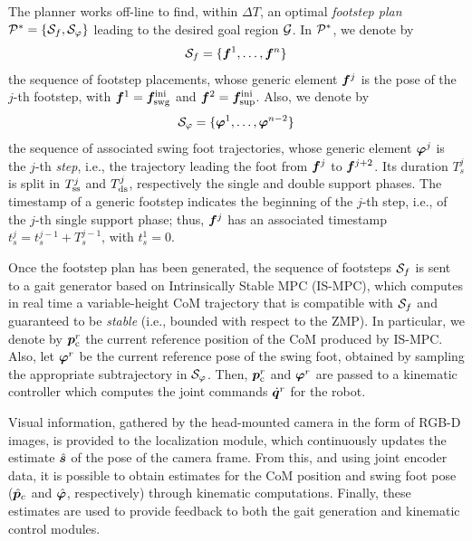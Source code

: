 The planner works off-line to find, within $\Delta T$, an optimal \textit{footstep plan} ${\cal P}^\ast = \{ {\cal S}_f, {\cal S}_\varphi \}$ leading to the desired goal region $\cal G$. In ${\cal P}^*$, we denote by
\begin{equation*}
    {\cal S}_f = \{{\bm{f}}^1, \dots, {\bm{f}}^n\}
\end{equation*}
the sequence of footstep placements, whose generic element ${\bm{f}}^j$ is the pose of the $j$-th footstep, with ${\bm{f}}^1 = {\bm{f}}_{\rm swg}^{\rm ini}$ and ${\bm{f}}^2 = {\bm{f}}_{\rm sup}^{\rm ini}$. Also, we denote by
\begin{equation*}
    {\cal S}_\varphi = \{{\bm{\varphi}}^1, \dots, {\bm{\varphi}}^{n-2}\}
\end{equation*} 
the sequence of associated swing foot trajectories, whose generic element ${\bm{\varphi}}^j$ is the $j$-th {\em step}, i.e., the trajectory leading the foot from ${\bm{f}}^{j}$ to ${\bm{f}}^{j+2}$. Its duration $T_s^j$ is split in $T_{\rm ss}^j$ and $T_{\rm ds}^j$, respectively the single and double support phases. 
The timestamp of a generic footstep indicates the beginning of the $j$-th step, i.e., of the $j$-th single support phase; thus, ${\bm{f}}^{j}$ has an associated timestamp $t_s^{j} = t_s^{j-1} + T_s^{j-1}$, with $t_s^{1}=0$.

Once the footstep plan has been generated, the sequence of footsteps ${\cal S}_{f}$ is sent to a gait generator based on Intrinsically Stable MPC (IS-MPC), which computes in real time a variable-height CoM trajectory that is compatible with ${\cal S}_{f}$ and guaranteed to be {\em stable} (i.e., bounded with respect to the ZMP). In particular, we denote by ${\bm{p}}_{\rm c}^r$ the current reference position of the CoM produced by IS-MPC. Also, let ${\bm{\varphi}}^r$ be the current reference pose of the swing foot, obtained by sampling the appropriate subtrajectory in ${\cal S}_{\varphi}$. Then, ${\bm{p}}_{\rm c}^r$ and ${\bm{\varphi}}^r$ are passed to a kinematic controller which computes the joint commands $\dot{{\bm{q}}}^r$ for the robot.

Visual information, gathered by the head-mounted camera in the form of RGB-D images, is provided to the localization module, which continuously updates the estimate $\hat{{\bm{s}}}$ of the pose of the camera frame.
From this, and using joint encoder data, it is possible to obtain estimates for the CoM position and swing foot pose ($\hat {{\bm{p}}}_c$ and $\hat {{\bm{\varphi}}}$, respectively) through kinematic computations. Finally, these estimates are used to provide feedback to both the gait generation and kinematic control modules.



